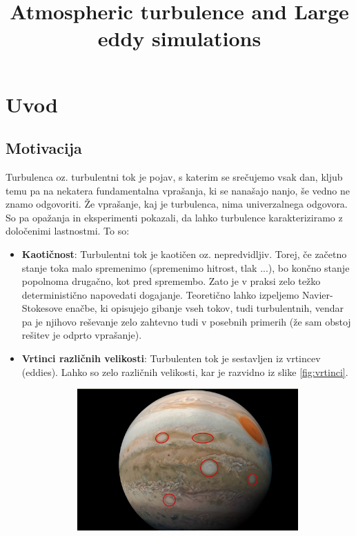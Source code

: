 \documentclass[mat2, tisk]{fmfdelo}
\title{Atmospheric turbulence and Large eddy simulations}
\begin{document}
\section{Uvod}

\subsection{Motivacija}
Turbulenca oz. turbulentni tok je pojav, s katerim se srečujemo vsak dan, kljub temu pa na nekatera fundamentalna
vprašanja, ki se nanašajo nanjo, še vedno ne znamo odgovoriti. Že vprašanje, kaj je turbulenca, nima
univerzalnega odgovora. So pa opažanja in eksperimenti pokazali, da lahko turbulence
karakteriziramo z določenimi lastnostmi. To so:
\begin{itemize}
\item \textbf{Kaotičnost}: Turbulentni tok je kaotičen oz. nepredvidljiv. Torej, če
začetno stanje toka malo spremenimo (spremenimo hitrost, tlak ...), bo končno stanje popolnoma
drugačno, kot pred spremembo. Zato je v praksi zelo težko deterministično napovedati dogajanje.
Teoretično lahko izpeljemo Navier-Stokesove enačbe, ki opisujejo gibanje vseh tokov, tudi turbulentnih,
vendar pa je njihovo reševanje zelo zahtevno tudi v posebnih primerih (že sam obstoj rešitev je 
odprto vprašanje).
\item \textbf{Vrtinci različnih velikosti}: Turbulenten tok je sestavljen iz vrtincev (eddies). Lahko so zelo
različnih velikosti, kar je razvidno iz slike \ref{fig:vrtinci}.
\begin{figure}[h!]
  \centering
  \begin{subfigure}{.5\textwidth}
    \centering
    \includegraphics[width=0.95\linewidth]{slike/vrtinci.jpeg}

\end{subfigure}
\end{figure}
\end{itemize}
\end{document}
